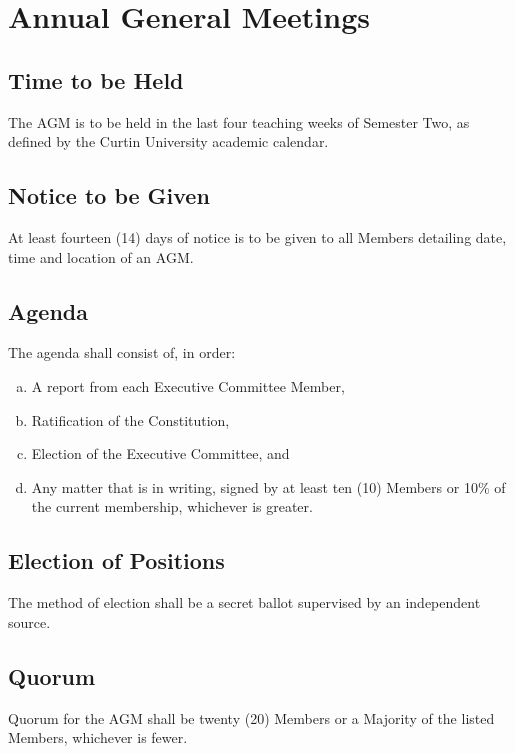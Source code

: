 \documentclass[a4paper,12pt]{article}
\begin{document}
\section{Annual General Meetings}

\subsection{Time to be Held}

The AGM is to be held in the last four teaching weeks of Semester Two, as defined by the Curtin University academic calendar.

\subsection{Notice to be Given}

At least fourteen (14) days of notice is to be given to all Members detailing date, time and location of an AGM.

\subsection{Agenda}

The agenda shall consist of, in order:

\begin{enumerate}[a)]
	\item A report from each Executive Committee Member,
	\item Ratification of the Constitution,
	\item Election of the Executive Committee, and
	\item Any matter that is in writing, signed by at least ten (10) Members or 10\% of the current membership, whichever is greater.
\end{enumerate}

\subsection{Election of Positions}

The method of election shall be a secret ballot supervised by an independent source.

\subsection{Quorum}

Quorum for the AGM shall be twenty (20) Members or a Majority of the listed Members, whichever is fewer.
\end{document}
